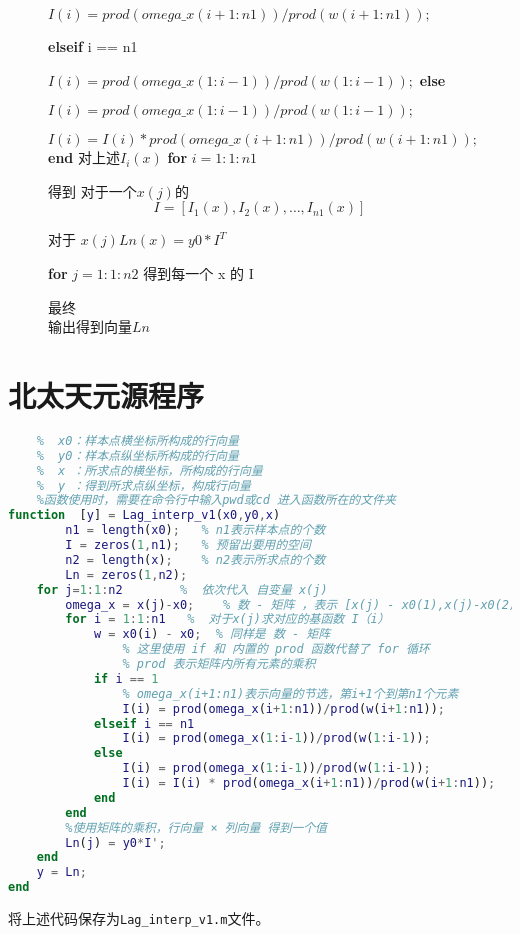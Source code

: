 \documentclass{xtupaper}
\begin{document}
\begin{figure}
\begin{algorithm}[H]
\begin{algorithmic}
					$ I(i) = prod(omega\_x(i+1:n1))/prod(w(i+1:n1)); $
					
			\State \textbf{elseif}  i == n1
 			
				$ I(i) = prod(omega\_x(1:i-1))/prod(w(1:i-1)); $
			\State \textbf{else}
			    
			    $I(i) = prod(omega\_x(1:i-1))/prod(w(1:i-1)); $
				
				$ I(i) = I(i) * prod(omega\_x(i+1:n1))/prod(w(i+1:n1)); $
			\State \textbf{end}
			\State 对上述$ I_i(x) $
			\State\textbf{for} $ i = 1:1:n1 $
			
			得到 对于一个$ x(j) $的 \[I= [I_1(x),I_2(x),\dots,I_{n1}(x)]\]
			
			\State 对于 $ x(j)   $\quad$ Ln(x) = y0*I^T $

			
			\State \textbf{for} $ j =1:1:n2 $
			\State 得到每一个 x 的 I
			
			\State 最终\\输出得到向量$ Ln $
				  
			
		\end{algorithmic}
	\end{algorithm}
\end{figure}
	\newpage
	\section{北太天元源程序}
	\begin{lstlisting}[language=matlab]
	%Lagrange 插值公式
	%  x0：样本点横坐标所构成的行向量
	%  y0：样本点纵坐标所构成的行向量
	%  x ：所求点的横坐标，所构成的行向量
	%  y ：得到所求点纵坐标，构成行向量
	%函数使用时，需要在命令行中输入pwd或cd 进入函数所在的文件夹
function  [y] = Lag_interp_v1(x0,y0,x)
		n1 = length(x0);   % n1表示样本点的个数 
		I = zeros(1,n1);   % 预留出要用的空间
		n2 = length(x);	   % n2表示所求点的个数
		Ln = zeros(1,n2);
	for j=1:1:n2    	%  依次代入 自变量 x(j) 
		omega_x = x(j)-x0;    % 数 - 矩阵 ，表示 [x(j) - x0(1),x(j)-x0(2),...,x(j)-x0(n1)]
		for i = 1:1:n1   %  对于x(j)求对应的基函数 I（i）
			w = x0(i) - x0;  % 同样是 数 - 矩阵
				% 这里使用 if 和 内置的 prod 函数代替了 for 循环
				% prod 表示矩阵内所有元素的乘积
			if i == 1	
				% omega_x(i+1:n1)表示向量的节选，第i+1个到第n1个元素
				I(i) = prod(omega_x(i+1:n1))/prod(w(i+1:n1));
			elseif i == n1
				I(i) = prod(omega_x(1:i-1))/prod(w(1:i-1));
			else
				I(i) = prod(omega_x(1:i-1))/prod(w(1:i-1));
				I(i) = I(i) * prod(omega_x(i+1:n1))/prod(w(i+1:n1));
			end 
		end
		%使用矩阵的乘积，行向量 × 列向量 得到一个值
		Ln(j) = y0*I'; 
	end	
	y = Ln;
end
	\end{lstlisting}
	将上述代码保存为\verb|Lag_interp_v1.m|文件。
	\newpage
\end{document}
